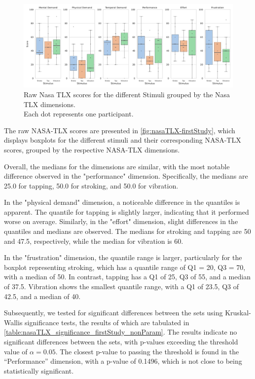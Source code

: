 \begin{figure}
    \centering
    \includegraphics[width=\linewidth]{src/pictures/Study1Data_questionnaire/NasaTLX_study1.pdf}
    \caption{Raw Nasa TLX scores for the different Stimuli grouped by the Nasa TLX dimensions.\\ Each dot represents one participant.}
    \label{fig:nasaTLX-firstStudy}
\end{figure}

The raw NASA-TLX scores are presented in \autoref{fig:nasaTLX-firstStudy}, which displays boxplots for the different stimuli and their corresponding NASA-TLX scores, grouped by the respective NASA-TLX dimensions.

Overall, the medians for the dimensions are similar, with the most notable difference observed in the "performance" dimension. Specifically, the medians are 25.0 for tapping, 50.0 for stroking, and 50.0 for vibration.

In the "physical demand" dimension, a noticeable difference in the quantiles is apparent. The quantile for tapping is slightly larger, indicating that it performed worse on average. Similarly, in the "effort" dimension, slight differences in the quantiles and medians are observed. The medians for stroking and tapping are 50 and 47.5, respectively, while the median for vibration is 60.

In the "frustration" dimension, the quantile range is larger, particularly for the boxplot representing stroking, which has a quantile range of Q1 = 20, Q3 = 70, with a median of 50. In contrast, tapping has a Q1 of 25, Q3 of 55, and a median of 37.5. Vibration shows the smallest quantile range, with a Q1 of 23.5, Q3 of 42.5, and a median of 40.

Subsequently, we tested for significant differences between the sets using Kruskal-Wallis significance tests, the results of which are tabulated in \autoref{table:nasaTLX_significance_firstStudy_nonParam}.
The results indicate no significant differences between the sets, with p-values exceeding the threshold value of $\alpha=0.05$.
The closest p-value to passing the threshold is found in the \enquote{Performance} dimension, with a p-value of 0.1496, which is not close to being statistically significant.




